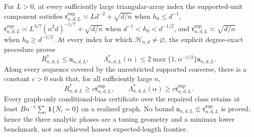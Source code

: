 For \(L>0\), at every sufficiently large triangular-array index the supported-unit component satisfies \(\mathfrak r^{\mathrm{sup}}_{n,d,L}\asymp Ld^{-2}+\sqrt{d/n}\) when \(h_0\leq d^{-1}\), \(\mathfrak r^{\mathrm{sup}}_{n,d,L}\asymp L^{3/7}(n^2d)^{-1/7}+\sqrt{d/n}\) when \(d^{-1}<h_0<d^{-1/2}\), and \(\mathfrak r^{\mathrm{sup}}_{n,d,L}\asymp\sqrt{d/n}\) when \(h_0\geq d^{-1/2}\).  At every index for which \(\mathcal H_{n,d}\ne\varnothing\), the explicit degree-exact procedure proves
\[
 R^*_{n,d,L}\leq\mathfrak u_{n,d,L},
 \qquad
 \Lambda^*_{n,d,L}(\alpha)
 \leq2\max\{1,\alpha^{-1/2}\}\mathfrak u_{n,d,L}.
\]
Along every sequence covered by the unrestricted supported converse, there is a constant \(c>0\) such that, for all sufficiently large \(n\),
\[
 R^*_{n,d,L}\geq c\mathfrak r^{\mathrm{sup}}_{n,d,L},
 \qquad
 \Lambda^*_{n,d,L}(\alpha)\geq c\mathfrak r^{\mathrm{sup}}_{n,d,L}.
\]
Every graph-only conditional-bias certificate over the repaired class retains at least \(Bn^{-1}\sum_i\mathbf1\{N_i=0\}\) on a realized graph.  No bound \(\mathfrak u_{n,d,L}\lesssim\mathfrak r^{\mathrm{sup}}_{n,d,L}\) is proved; hence the three analytic phases are a tuning geometry and a minimax lower benchmark, not an achieved honest expected-length frontier.